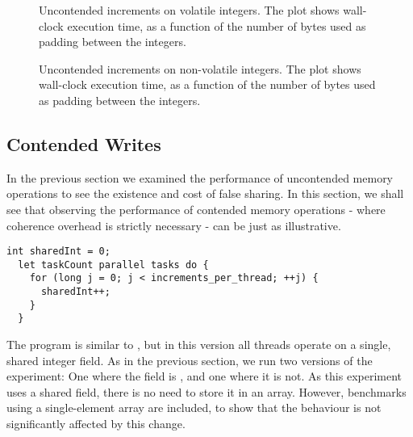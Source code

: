 \begin{figure}[hbpt]
\graphicspath{{plots/}}

\caption{Uncontended increments on volatile integers. The plot shows wall-clock
	execution time, as a function of the number of bytes used as padding
	between the integers.}
	\label{fig:uncont}
\end{figure}

\begin{figure}[hbpt]
\graphicspath{{plots/}}

\caption{Uncontended increments on non-volatile integers. The plot shows
	wall-clock execution time, as a function of the number of bytes used as padding
	between the integers.}
\label{fig:uncont-nob}
\end{figure}


\subsection{Contended Writes}

In the previous section we examined the performance of uncontended memory
operations to see the existence and cost of false sharing. In this section, we
shall see that observing the performance of contended memory operations - where
coherence overhead is strictly necessary - can be just as illustrative.

\begin{code}
\begin{Verbatim}[frame=single]
  int sharedInt = 0;
  let taskCount parallel tasks do {
    for (long j = 0; j < increments_per_thread; ++j) {
      sharedInt++;
    }
  }
\end{Verbatim}
	\caption{Simplified code for the local-field version of the contended-writes
	experiment.}
\end{code}

The program is similar to , but in this
version all threads operate on a single, shared integer field. As in the previous
section, we run two versions of the experiment: One where the field is
, and one where it is not. As this experiment uses a shared field,
there is no need to store it in an array. However, benchmarks using a
single-element array are included, to show that the behaviour is not
significantly affected by this change.

